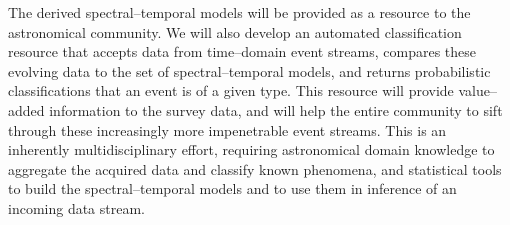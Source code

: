\bigskip \centerline{}

The derived spectral--temporal models will be provided as a resource to the
astronomical community.  We will also develop an automated classification
resource that accepts data from time--domain event streams, compares these
evolving data to the set of spectral--temporal models, and returns probabilistic
classifications that an event is of a given type.  This resource will provide
value--added information to the survey data, and will help the entire community
to sift through these increasingly more impenetrable event streams. This is an
inherently multidisciplinary effort, requiring astronomical domain knowledge to
aggregate the acquired data and classify known phenomena, and statistical tools
to build the spectral--temporal models and to use them in inference of an
incoming data stream.